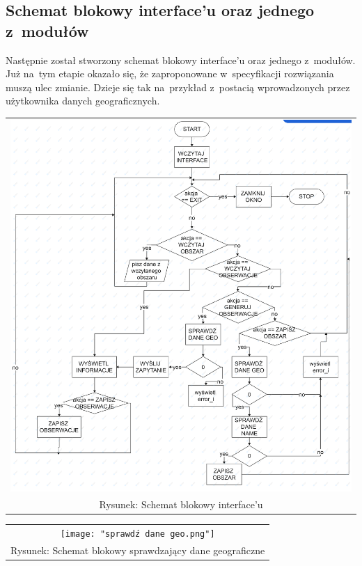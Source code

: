 \documentclass{article}
\begin{document}
 \subsection{Schemat blokowy interface'u oraz jednego z~modułów}
Następnie został stworzony schemat blokowy interface'u oraz jednego z~modułów. Już na~tym etapie okazało się, że zaproponowane w~specyfikacji rozwiązania muszą ulec zmianie. Dzieje się tak na~przykład z~postacią wprowadzonych przez użytkownika danych geograficznych.
\begin{center}
\begin{tabular}{c}
\includegraphics[scale =.1]{"projekt interace'u.png"}
\\
Rysunek: Schemat blokowy interface'u
\end{tabular}
\end{center}
\begin{center}
\begin{tabular}{c}
\texttt{[image: "sprawdź dane geo.png"]}
\\Rysunek: Schemat blokowy sprawdzający dane geograficzne
\end{tabular}
\end{center}
\newpage
\end{document}
